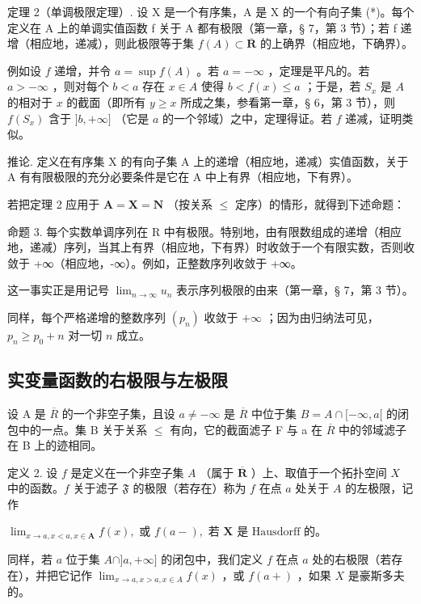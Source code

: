 定理 2（单调极限定理）. 设 X 是一个有序集，A 是 X 的一个有向子集 (*)。每个定义在 A 上的单调实值函数 f 关于 A 都有极限（第一章，§ 7，第 3 节）；若 f 递增（相应地，递减），则此极限等于集 \(f(A) \subset \overline{\mathbf{R}}\) 的上确界（相应地，下确界）。

例如设 \(f\) 递增，并令 \(a = \sup f(A)\) 。若 \(a = -\infty\) ，定理是平凡的。若 \(a > -\infty\) ，则对每个 \(b < a\) 存在 \(x \in A\) 使得 \(b < f(x) \leqslant a\) ；于是，若 \(S_x\) 是 \(A\) 的相对于 \(x\) 的截面（即所有 \(y \geqslant x\) 所成之集，参看第一章，§ 6，第 3 节），则 \(f(S_x)\) 含于 \(]b, +\infty]\) （它是 \(a\) 的一个邻域）之中，定理得证。若 \(f\) 递减，证明类似。

推论. 定义在有序集 X 的有向子集 A 上的递增（相应地，递减）实值函数，关于 A 有有限极限的充分必要条件是它在 A 中上有界（相应地，下有界）。

若把定理 2 应用于 \(\mathbf{A} = \mathbf{X} = \mathbf{N}\) （按关系 \(\leqslant\) 定序）的情形，就得到下述命题：

命题 3. 每个实数单调序列在 R 中有极限。特别地，由有限数组成的递增（相应地，递减）序列，当其上有界（相应地，下有界）时收敛于一个有限实数，否则收敛于 +∞（相应地，-∞）。例如，正整数序列收敛于 +∞。

这一事实正是用记号 \(\lim_{n\to \infty}u_n\) 表示序列极限的由来（第一章，§ 7，第 3 节）。

同样，每个严格递增的整数序列 \((p_n)\) 收敛于 \(+\infty\) ；因为由归纳法可见，\(p_n \geqslant p_0 + n\) 对一切 \(n\) 成立。

\subsection{实变量函数的右极限与左极限}

设 A 是 \(\overline{R}\) 的一个非空子集，且设 \(a \neq -\infty\) 是 \(\overline{R}\) 中位于集 \(B = A \cap [-\infty, a[\) 的闭包中的一点。集 B 关于关系 \(\leqslant\) 有向，它的截面滤子 F 与 a 在 \(\overline{R}\) 中的邻域滤子在 B 上的迹相同。

定义 2. 设 \(f\) 是定义在一个非空子集 \(A\) （属于 \(\overline{\mathbf{R}}\) ）上、取值于一个拓扑空间 \(X\) 中的函数。\(f\) 关于滤子 \(\mathfrak{F}\) 的极限（若存在）称为 \(f\) 在点 \(a\) 处关于 \(A\) 的左极限，记作

\(\lim_{x \to a, x < a, x \in \mathbf{A}} f(x), \text{ 或 } f(a - ), \text{ 若 } \mathbf{X} \text{ 是 Hausdorff 的。}\)

同样，若 \(a\) 位于集 \(A \cap ]a, +\infty]\) 的闭包中，我们定义 \(f\) 在点 \(a\) 处的右极限（若存在），并把它记作 \(\lim_{x \to a, x > a, x \in A} f(x)\) ，或 \(f(a+)\) ，如果 \(X\) 是豪斯多夫的。

